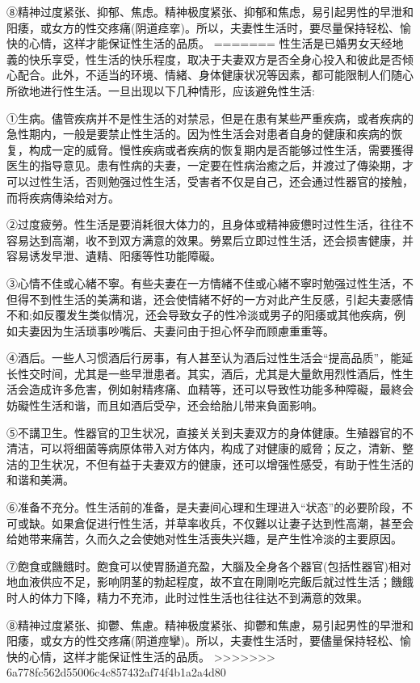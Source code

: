 \documentclass[12pt,UTF8]{ctexbook}
\begin{document}
⑧精神过度紧张、抑郁、焦虑。精神极度紧张、抑郁和焦虑，易引起男性的早泄和阳痿，或女方的性交疼痛(阴道痉挛)。所以，夫妻性生活时，要尽量保持轻松、愉快的心情，这样才能保证性生活的品质。
=======
性生活是已婚男女天经地義的快乐享受，性生活的快乐程度，取决于夫妻双方是否全身心投入和彼此是否倾心配合。此外，不适当的环境、情緒、身体健康状况等因素，都可能限制人们随心所欲地进行性生活。一旦出现以下几种情形，应该避免性生活:

①生病。儘管疾病并不是性生活的对禁忌，但是在患有某些严重疾病，或者疾病的急性期内，一般是要禁止性生活的。因为性生活会对患者自身的健康和疾病的恢复，构成一定的威脅。慢性疾病或者疾病的恢复期内是否能够过性生活，需要獲得医生的指导意见。患有性病的夫妻，一定要在性病治癒之后，并渡过了傳染期，才可以过性生活，否则勉强过性生活，受害者不仅是自己，还会通过性器官的接触，而将疾病傳染给对方。

②过度疲勞。性生活是要消耗很大体力的，且身体或精神疲憊时过性生活，往往不容易达到高潮，收不到双方满意的效果。勞累后立即过性生活，还会损害健康，并容易诱发早泄、遺精、阳痿等性功能障礙。

③心情不佳或心緒不寧。有些夫妻在一方情緒不佳或心緒不寧时勉强过性生活，不但得不到性生活的美满和谐，还会使情緒不好的一方对此产生反感，引起夫妻感情不和;如反覆发生类似情况，还会导致女子的性冷淡或男子的阳痿或其他疾病，例如夫妻因为生活琐事吵嘴后、夫妻问由于担心怀孕而顾慮重重等。

④酒后。一些人习惯酒后行房事，有人甚至认为酒后过性生活会“提高品质”，能延长性交时间，尤其是一些早泄患者。其实，酒后，尤其是大量飲用烈性酒后，性生活会造成许多危害，例如射精疼痛、血精等，还可以导致性功能多种障礙，最終会妨礙性生活和谐，而且如酒后受孕，还会给胎儿带来負面影响。

⑤不講卫生。性器官的卫生状况，直接关关到夫妻双方的身体健康。生殖器官的不清洁，可以将细菌等病原体带入对方体内，构成了对健康的威脅；反之，清新、整洁的卫生状况，不但有益于夫妻双方的健康，还可以增强性感受，有助于性生活的和谐和美满。

⑥准备不充分。性生活前的准备，是夫妻间心理和生理进入“状态”的必要阶段，不可或缺。如果倉促进行性生活，并草率收兵，不仅難以让妻子达到性高潮，甚至会给她带来痛苦，久而久之会使她对性生活喪失兴趣，是产生性冷淡的主要原因。

⑦飽食或饑餓时。飽食可以使胃肠道充盈，大腦及全身各个器官(包括性器官)相对地血液供应不足，影响阴茎的勃起程度，故不宜在剛剛吃完飯后就过性生活；饑餓时人的体力下降，精力不充沛，此时过性生活也往往达不到满意的效果。

⑧精神过度紧张、抑鬱、焦慮。精神极度紧张、抑鬱和焦慮，易引起男性的早泄和阳痿，或女方的性交疼痛(阴道痙攣)。所以，夫妻性生活时，要儘量保持轻松、愉快的心情，这样才能保证性生活的品质。
>>>>>>> 6a778fc562d55006c4c857432af74f4b1a2a4d80
\end{document}
